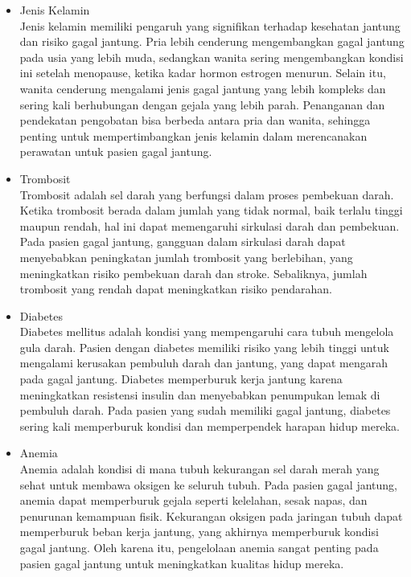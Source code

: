 \documentclass[english,12pt,a4paper,openany]{book}
\begin{document}
\begin{enumerate}
\begin{itemize}
			\item Jenis Kelamin\\
			Jenis kelamin memiliki pengaruh yang signifikan terhadap kesehatan jantung dan risiko gagal jantung. Pria lebih cenderung mengembangkan gagal jantung pada usia yang lebih muda, sedangkan wanita sering mengembangkan kondisi ini setelah menopause, ketika kadar hormon estrogen menurun. Selain itu, wanita cenderung mengalami jenis gagal jantung yang lebih kompleks dan sering kali berhubungan dengan gejala yang lebih parah. Penanganan dan pendekatan pengobatan bisa berbeda antara pria dan wanita, sehingga penting untuk mempertimbangkan jenis kelamin dalam merencanakan perawatan untuk pasien gagal jantung.
			
			\item Trombosit\\
			Trombosit adalah sel darah yang berfungsi dalam proses pembekuan darah. Ketika trombosit berada dalam jumlah yang tidak normal, baik terlalu tinggi maupun rendah, hal ini dapat memengaruhi sirkulasi darah dan pembekuan. Pada pasien gagal jantung, gangguan dalam sirkulasi darah dapat menyebabkan peningkatan jumlah trombosit yang berlebihan, yang meningkatkan risiko pembekuan darah dan stroke. Sebaliknya, jumlah trombosit yang rendah dapat meningkatkan risiko pendarahan.
			
			\item Diabetes\\
			Diabetes mellitus adalah kondisi yang mempengaruhi cara tubuh mengelola gula darah. Pasien dengan diabetes memiliki risiko yang lebih tinggi untuk mengalami kerusakan pembuluh darah dan jantung, yang dapat mengarah pada gagal jantung. Diabetes memperburuk kerja jantung karena meningkatkan resistensi insulin dan menyebabkan penumpukan lemak di pembuluh darah. Pada pasien yang sudah memiliki gagal jantung, diabetes sering kali memperburuk kondisi dan memperpendek harapan hidup mereka.
			
			\item Anemia\\
			Anemia adalah kondisi di mana tubuh kekurangan sel darah merah yang sehat untuk membawa oksigen ke seluruh tubuh. Pada pasien gagal jantung, anemia dapat memperburuk gejala seperti kelelahan, sesak napas, dan penurunan kemampuan fisik. Kekurangan oksigen pada jaringan tubuh dapat memperburuk beban kerja jantung, yang akhirnya memperburuk kondisi gagal jantung. Oleh karena itu, pengelolaan anemia sangat penting pada pasien gagal jantung untuk meningkatkan kualitas hidup mereka.
			

\end{itemize}
\end{enumerate}
\end{document}
